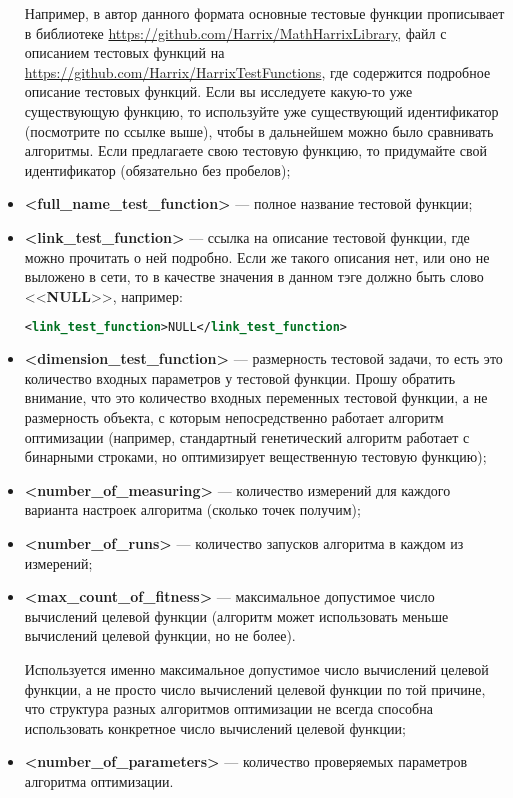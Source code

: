 \documentclass[a4paper,12pt]{article}
\begin{document}
\begin{itemize}
Например, в автор данного формата основные тестовые функции прописывает в библиотеке \href {https://github.com/Harrix/MathHarrixLibrary} {https://github.com/Harrix/MathHarrixLibrary}, файл с описанием тестовых функций на \href {https://github.com/Harrix/HarrixTestFunctions} {https://github.com/Harrix/HarrixTestFunctions}, где содержится подробное описание тестовых функций. Если вы исследуете какую-то уже существующую функцию, то используйте уже существующий идентификатор (посмотрите по ссылке выше), чтобы в дальнейшем можно было сравнивать алгоритмы. Если предлагаете свою тестовую функцию, то придумайте свой идентификатор (обязательно без пробелов);
\item \textbf{<full\_name\_test\_function>} --- полное название тестовой функции;
\item \textbf{<link\_test\_function>} --- ссылка на описание тестовой функции, где можно прочитать о ней подробно. Если же такого описания нет, или оно не выложено в сети, то в качестве значения в данном тэге должно быть слово <<\textbf{NULL}>>, например:
\begin{lstlisting}[label=Part09, language=xml ,caption=У алгоритма нет ссылки в файле Harrix Optimization Testing]
<link_test_function>NULL</link_test_function>
\end{lstlisting}
\item \textbf{<dimension\_test\_function>} --- размерность тестовой задачи, то есть это количество входных параметров у тестовой функции. Прошу обратить внимание, что это количество входных переменных тестовой функции, а не размерность объекта, с которым непосредственно работает алгоритм оптимизации (например, стандартный генетический алгоритм работает с бинарными строками, но оптимизирует вещественную тестовую функцию);
\item \textbf{<number\_of\_measuring>} --- количество измерений для каждого варианта настроек алгоритма (сколько точек получим);
\item \textbf{<number\_of\_runs>} --- количество запусков алгоритма в каждом из измерений;
\item \textbf{<max\_count\_of\_fitness>} --- максимальное допустимое число вычислений целевой функции (алгоритм может использовать меньше вычислений целевой функции, но не более).

Используется именно максимальное допустимое число вычислений целевой функции, а не просто число вычислений целевой функции по той причине, что структура разных алгоритмов оптимизации не всегда способна использовать конкретное число вычислений целевой функции;
\item \textbf{<number\_of\_parameters>} --- количество проверяемых параметров алгоритма оптимизации.


\end{itemize}
\end{document}

